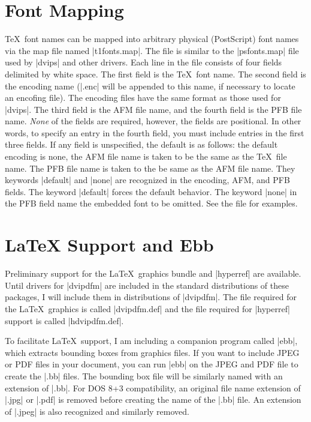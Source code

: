 {\section{Font Mapping}
\TeX\ font names can be
mapped into arbitrary physical (PostScript) font names via
the map file named |t1fonts.map|.  The file is
similar to the |psfonts.map| file used by |dvips|
and other drivers.  Each line in the
file consists of four fields delimited
by white space.  The first field
is the \TeX\ font name.  The second
field is the encoding name (|.enc| will
be appended to this name, if necessary
to locate an encofing file).  The
encoding files have the same format
as those used for |dvips|.
The third field is the AFM file name,
and the fourth field is the PFB file name.
{\it None} of the fields are required, however,
the fields are positional.  In other words,
to specify an entry in the fourth field,
you must include entries in the first
three fields.
If any field is unspecified, the default
is as follows:  the default encoding is none,
the AFM file name is taken
to be the same as the \TeX\ file name.
The PFB file name is taken to the be
same as the AFM file name.  They
keywords |default| and |none| are
recognized in the encoding, AFM, and PFB fields.
The keyword |default| forces the default behavior.
The keyword |none| in the PFB field name
the embedded font to be omitted.
See the file for examples.

\section{LaTeX Support and Ebb}
Preliminary support for the La\TeX\ graphics bundle and |hyperref|
are available.  Until drivers for |dvipdfm| are included
in the standard distributions of these packages,
I will include them in distributions of |dvipdfm|.
The file required for the La\TeX\ graphics is
called |dvipdfm.def| and the file required for |hyperref|
support is called |hdvipdfm.def|.  

To facilitate La\TeX\ support, I am including a companion program
called |ebb|, which extracts bounding boxes from graphics files.  If
you want to include JPEG or PDF files in your document, you can run
|ebb| on the JPEG and PDF file to create the |.bb| files.
The bounding box file will be similarly named with an extension of |.bb|.
For DOS 8+3 compatibility, an original file name extension 
of |.jpg| or |.pdf| is removed before creating the name of
the |.bb| file. An extension of |.jpeg| is also recognized and similarly removed.

}
